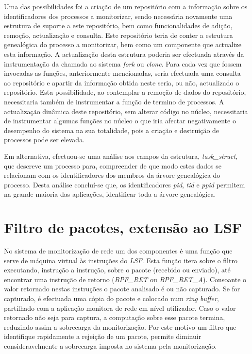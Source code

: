 Uma das possibilidades foi a criação de um repositório com a informação sobre os identificadores dos processos a monitorizar, sendo necessária novamente uma estrutura de suporte a este repositório, bem como funcionalidades de adição, remoção, actualização e consulta.
Este repositório teria de conter a estrutura genealógica do processo a monitorizar, bem como um componente que actualize esta informação.
A actualização desta estrutura poderia ser efectuada através da instrumentação da chamada ao sistema \textit{fork} ou \textit{clone}.
Para cada vez que fossem invocadas as funções, anteriormente mencionadas, seria efectuada uma consulta ao repositório e apartir da informação obtida neste seria, ou não, actualizado o repositório.
Esta possibilidade, ao contemplar a remoção de dados do repositório, necessitaria também de instrumentar a função de termino de processos.
A actualização dinâmica deste repositório, sem alterar código no núcleo, necessitaria de instrumentar algumas funções no núcleo o que iria afectar negativamente o desempenho do sistema na sua totalidade, pois a criação e destruição de processos pode ser elevada.

Em alternativa, efectuou-se uma análise aos campos da estrutura, \textit{task\_struct}, que descreve um processo para, compreender de que modo estes dados se relacionam com os identificadores dos membros da árvore genealógica do processo.
Desta análise concluí-se que, os identificadores \textit{pid}, \textit{tid} e \textit{ppid} permitem na grande maioria das aplicações, identificar toda a árvore genealógica.




\section{Filtro de pacotes, extensão ao LSF}

No sistema de monitorização de rede um dos componentes é uma função que serve de máquina virtual às instruções do \textit{LSF}.
Esta função itera sobre o filtro executando, instrução a instrução, sobre o pacote (recebido ou enviado), até encontrar uma instrução de retorno (\textit{BPF\_RET} ou \textit{BPF\_RET\_A}).
Consoante o valor retornado nestas instruções o pacote analisado é ou não capturado.
Se for capturado, é efectuada uma cópia do pacote e colocado num \textit{ring buffer}, partilhado com a aplicação monitora de rede em nível utilizador.
Caso o valor retornado não seja para captura, a computação sobre esse pacote termina, reduzindo assim a sobrecarga da monitorização.
Por este motivo um filtro que identifique rapidamente a rejeição de um pacote, permite diminuir consideravelmente a sobrecarga imposta no sistema pela monitorização.

